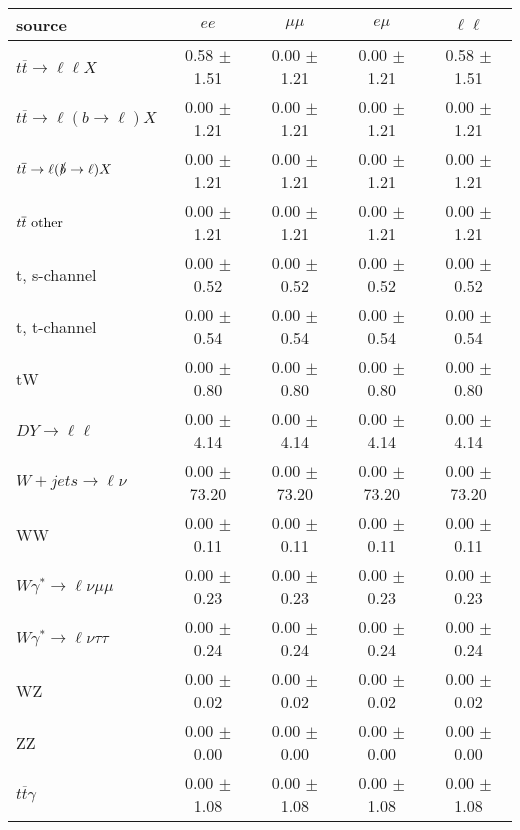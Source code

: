 \begin{tabular}{l|cccc} \hline\hline
source & $ee$ & $\mu\mu$ & $e\mu$ & $\ell\ell $ \\
\hline
$t\overline{t} \rightarrow \ell \ell X$ &  0.58 $\pm$  1.51 &  0.00 $\pm$  1.21 &  0.00 $\pm$  1.21 &  0.58 $\pm$  1.51 \\
$t\overline{t} \rightarrow \ell (b \rightarrow \ell) X$ &  0.00 $\pm$  1.21 &  0.00 $\pm$  1.21 &  0.00 $\pm$  1.21 &  0.00 $\pm$  1.21 \\
$t\overline{t} \rightarrow \ell (\slashed b \rightarrow \ell) X$ &  0.00 $\pm$  1.21 &  0.00 $\pm$  1.21 &  0.00 $\pm$  1.21 &  0.00 $\pm$  1.21 \\
        $t\overline{t}\ \rm{other}$ &  0.00 $\pm$  1.21 &  0.00 $\pm$  1.21 &  0.00 $\pm$  1.21 &  0.00 $\pm$  1.21 \\
\hline
                       t, s-channel &  0.00 $\pm$  0.52 &  0.00 $\pm$  0.52 &  0.00 $\pm$  0.52 &  0.00 $\pm$  0.52 \\
                       t, t-channel &  0.00 $\pm$  0.54 &  0.00 $\pm$  0.54 &  0.00 $\pm$  0.54 &  0.00 $\pm$  0.54 \\
                                 tW &  0.00 $\pm$  0.80 &  0.00 $\pm$  0.80 &  0.00 $\pm$  0.80 &  0.00 $\pm$  0.80 \\
\hline
         $DY \rightarrow \ell \ell$ &  0.00 $\pm$  4.14 &  0.00 $\pm$  4.14 &  0.00 $\pm$  4.14 &  0.00 $\pm$  4.14 \\
      $W+jets \rightarrow \ell \nu$ &  0.00 $\pm$ 73.20 &  0.00 $\pm$ 73.20 &  0.00 $\pm$ 73.20 &  0.00 $\pm$ 73.20 \\
                                 WW &  0.00 $\pm$  0.11 &  0.00 $\pm$  0.11 &  0.00 $\pm$  0.11 &  0.00 $\pm$  0.11 \\
\hline
$W\gamma^{*} \rightarrow \ell \nu \mu\mu$ &  0.00 $\pm$  0.23 &  0.00 $\pm$  0.23 &  0.00 $\pm$  0.23 &  0.00 $\pm$  0.23 \\
$W\gamma^{*} \rightarrow \ell \nu \tau\tau$ &  0.00 $\pm$  0.24 &  0.00 $\pm$  0.24 &  0.00 $\pm$  0.24 &  0.00 $\pm$  0.24 \\
                                 WZ &  0.00 $\pm$  0.02 &  0.00 $\pm$  0.02 &  0.00 $\pm$  0.02 &  0.00 $\pm$  0.02 \\
                                 ZZ &  0.00 $\pm$  0.00 &  0.00 $\pm$  0.00 &  0.00 $\pm$  0.00 &  0.00 $\pm$  0.00 \\
\hline
              $t\overline{t}\gamma$ &  0.00 $\pm$  1.08 &  0.00 $\pm$  1.08 &  0.00 $\pm$  1.08 &  0.00 $\pm$  1.08 \\

\end{tabular}
